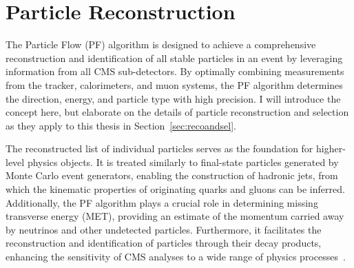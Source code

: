 
\section{Particle Reconstruction}

The Particle Flow (PF) algorithm is designed to achieve a comprehensive reconstruction and identification of all stable particles in an event by leveraging information from all CMS sub-detectors. By optimally combining measurements from the tracker, calorimeters, and muon systems, the PF algorithm determines the direction, energy, and particle type with high precision. I will introduce the concept here, but elaborate on the details of particle reconstruction and selection as they apply to this thesis in Section~\ref{sec:recoandsel}.

The reconstructed list of individual particles serves as the foundation for higher-level physics objects. It is treated similarly to final-state particles generated by Monte Carlo event generators, enabling the construction of hadronic jets, from which the kinematic properties of originating quarks and gluons can be inferred. Additionally, the PF algorithm plays a crucial role in determining missing transverse energy (MET), providing an estimate of the momentum carried away by neutrinos and other undetected particles. Furthermore, it facilitates the reconstruction and identification of particles through their decay products, enhancing the sensitivity of CMS analyses to a wide range of physics processes~\cite{Beaudette:1645993}.


